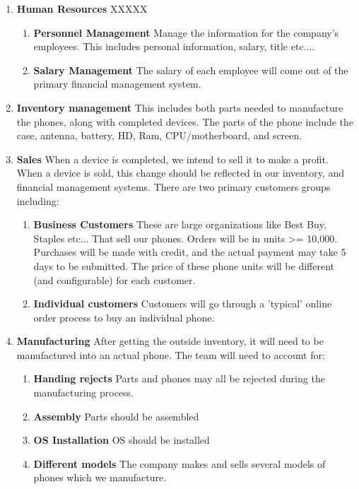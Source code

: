 \documentclass{sig-alternate-05-2015}
\begin{document}
\begin{enumerate}

\item \textbf{Human Resources} XXXXX

	\begin{enumerate}
	\item \textbf{Personnel Management} Manage the information for the company's employees. This includes personal information, salary, title etc....
	\item \textbf{Salary Management} The salary of each employee will come out of the primary financial management system.
	\end{enumerate}

\item \textbf{Inventory management} This includes both parts needed to manufacture the phones, along with completed devices. The parts of the phone include the case, antenna, battery, HD, Ram, CPU/motherboard, and screen.
\item \textbf{Sales} When a device is completed, we intend to sell it to make a profit. When a device is sold, this change should be reflected in our inventory, and financial management systems. There are two primary customers groups including:
	\begin{enumerate}
	\item \textbf{Business Customers} These are large organizations like Best Buy, Staples etc... That sell our phones. Orders will be in units >= 10,000. Purchases will be made with credit, and the actual payment may take 5 days to be submitted. The price of these phone units will be different (and configurable) for each customer.
	\item \textbf{Individual customers} Customers will go through a 'typical' online order process to buy an individual phone.
	\end{enumerate}


\item \textbf{Manufacturing} After getting the outside inventory, it will need to be manufactured into an actual phone. The team will need to account for:
	\begin{enumerate}

	\item \textbf{Handing rejects} Parts and phones may all be rejected during the manufacturing process.
	\item \textbf{Assembly} Parts should be assembled
	\item \textbf{OS Installation} OS should be installed
	\item \textbf{Different models} The company makes and sells several models of phones which we manufacture.


\end{enumerate}
\end{enumerate}
\end{document}
